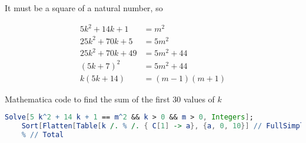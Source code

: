 \documentclass[12pt]{scrartcl}
\begin{document}
It must be a square of a natural number, so

\begin{align*}
    5k^2+14k+1   & =m^2        \\
    25k^2+70k+5  & =5m^2       \\
    25k^2+70k+49 & =5m^2+44    \\
    (5k+7)^2     & =5m^2+44    \\
    k(5k+14)     & =(m-1)(m+1)
\end{align*}

Mathematica code to find the sum of the first 30 values of $k$

\begin{lstlisting}[language=Mathematica]
    Solve[5 k^2 + 14 k + 1 == m^2 && k > 0 && m > 0, Integers];
    Sort[Flatten[Table[k /. % /. { C[1] -> a}, {a, 0, 10}] // FullSimplify]][[1 ;; 30]]
    % // Total
\end{lstlisting}
\end{document}
